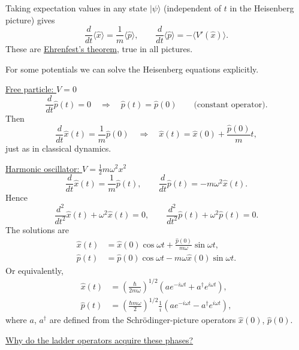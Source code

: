 \documentclass[11pt,a4paper]{article}
\begin{document}
Taking expectation values in any state $|\psi\rangle$ (independent of $t$
in the Heisenberg picture) gives
\[
    \frac{d}{dt}\langle\hat{x}\rangle=\frac{1}{m}\langle\hat{p}\rangle,
    \qquad
    \frac{d}{dt}\langle\hat{p}\rangle=-\langle V'(\hat{x})\rangle.
\]
These are \underline{Ehrenfest's theorem}, true in all pictures.

For some potentials we can solve the Heisenberg equations explicitly.

\medskip
\noindent
\underline{Free particle: $V=0$}
\[
    \frac{d}{dt}\hat{p}(t)=0
    \quad\Rightarrow\quad
    \hat{p}(t)=\hat{p}(0)
    \qquad\text{(constant operator).}
\]
Then
\[
    \frac{d}{dt}\hat{x}(t)=\frac{1}{m}\hat{p}(0)
    \quad\Rightarrow\quad
    \hat{x}(t)=\hat{x}(0)+\frac{\hat{p}(0)}{m}t,
\]
just as in classical dynamics.

\medskip
\noindent
\underline{Harmonic oscillator: $V=\frac{1}{2}m\omega^2x^2$}
\[
    \frac{d}{dt}\hat{x}(t)=\frac{1}{m}\hat{p}(t),
    \qquad
    \frac{d}{dt}\hat{p}(t)=-m\omega^2\hat{x}(t).
\]
Hence
\[
    \frac{d^2}{dt^2}\hat{x}(t)+\omega^2\hat{x}(t)=0,
    \qquad
    \frac{d^2}{dt^2}\hat{p}(t)+\omega^2\hat{p}(t)=0.
\]
The solutions are
\begin{align*}
    \hat{x}(t)&=\hat{x}(0)\cos\omega t
        +\frac{\hat{p}(0)}{m\omega}\sin\omega t,\\
    \hat{p}(t)&=\hat{p}(0)\cos\omega t
        -m\omega\hat{x}(0)\sin\omega t.
\end{align*}
Or equivalently,
\begin{align*}
    \hat{x}(t)&=\left(\frac{\hbar}{2m\omega}\right)^{1/2}
        \left(ae^{-i\omega t}+a^\dagger e^{i\omega t}\right),\\
    \hat{p}(t)&=\left(\frac{\hbar m\omega}{2}\right)^{1/2}\frac{1}{i}
        \left(ae^{-i\omega t}-a^\dagger e^{i\omega t}\right),
\end{align*}
where $a$, $a^\dagger$ are defined from the Schr\"odinger-picture operators
$\hat{x}(0)$, $\hat{p}(0)$.

\medskip
\noindent
\underline{Why do the ladder operators acquire these phases?}
\end{document}
